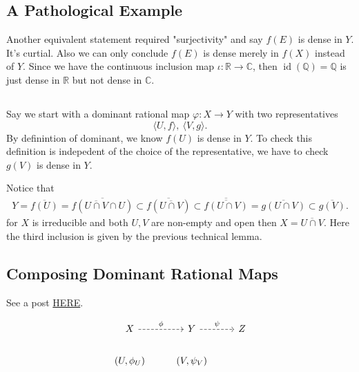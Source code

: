 \subsection{A Pathological Example}

Another equivalent statement required "surjectivity" and say $f(E)$ is dense in $Y$. It's curtial. Also we can only conclude $f(E)$ is dense merely in $f(X)$ instead of $Y$. Since we have the continuous inclusion map $\iota:\mathbb R\to\mathbb C$, then $\operatorname{id}(\mathbb Q)=\mathbb Q$ is just dense in $\mathbb R$ but not dense in $\mathbb C$.

\subsection{}

Say we start with a dominant rational map $\varphi:X\to Y$ with two representatives 
\[\langle U,f\rangle,~\langle V,g\rangle.\]
By definintion of dominant, we know $f(U)$ is dense in $Y$. To check this definition is indepedent of the choice of the representative, we have to check $g(V)$ is dense in $Y$.

Notice that 
\begin{align*}
    Y=\overline{f(U)}=\overline{f(\overline{U\cap V}\cap U)}\subset\overline{f(\overline{U\cap V})}\subset \overline{\overline{f(U\cap V)}}=\overline{g(U\cap V)}\subset \overline{g(V)}.
\end{align*} for $X$ is irreducible and both $U,V$ are non-empty and open then $X=\overline{U\cap V}$. Here the third inclusion is given by the previous technical lemma.

\subsection{Composing Dominant Rational Maps}

See a post \href{https://math.stackexchange.com/questions/459827/how-to-define-the-composition-of-two-dominant-rational-maps}{HERE}.

\[\begin{tikzcd}
	X & Y & Z \\
	{(U,\phi_U)} & {(V,\psi_V)}
	\arrow["\phi", dashed, from=1-1, to=1-2]
	\arrow["\psi", dashed, from=1-2, to=1-3]
\end{tikzcd}\]

